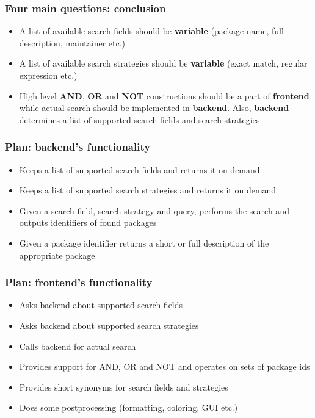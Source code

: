 \documentclass[hyperref=unicode,ascii,xcolor=dvipsnames]{beamer}
\begin{document}

\begin{frame}[fragile]
  \frametitle{Four main questions: conclusion}
  \begin{itemize}
  \item A list of available search fields should be {\bf variable} (package
    name, full description, maintainer etc.)
  \item A list of available search strategies should be {\bf variable}
    (exact match, regular expression etc.)
  \item High level {\bf AND}, {\bf OR} and {\bf NOT} constructions
    should be a part of {\bf frontend} while actual search should be
    implemented in {\bf backend}. Also, {\bf backend} determines a list of
    supported search fields and search strategies
  \end{itemize}
\end{frame}


\begin{frame}[fragile]
  \frametitle{Plan: backend's functionality}
  \begin{itemize}
  \item Keeps a list of supported search fields and returns it on demand
  \item Keeps a list of supported search strategies and returns it on demand
  \item Given a search field, search strategy and query, performs the
    search and outputs identifiers of found packages
  \item Given a package identifier returns a short or full description
    of the appropriate package
  \end{itemize}
\end{frame}


\begin{frame}[fragile]
  \frametitle{Plan: frontend's functionality}
  \begin{itemize}
  \item Asks backend about supported search fields
  \item Asks backend about supported search strategies
  \item Calls backend for actual search
  \item Provides support for AND, OR and NOT and operates on sets of package ids
  \item Provides short synonyms for search fields and strategies
  \item Does some postprocessing (formatting, coloring, GUI etc.)
  \end{itemize}
\end{frame}
\end{document}
